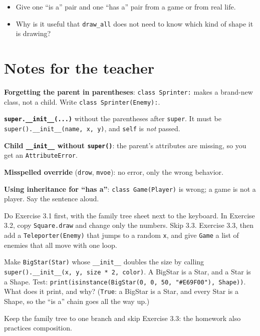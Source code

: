 \begin{reflection}
\begin{itemize}[itemsep=1pt]
  \item Give one \enquote{is a} pair and one \enquote{has a} pair from a game or from real life.
  \item Why is it useful that \texttt{draw\_all} does not need to know which kind of shape it is drawing?
\end{itemize}
\end{reflection}

\section{Notes for the teacher}
\begin{commonmistakes}
  \item \textbf{Forgetting the parent in parentheses}: \texttt{class Sprinter:} makes a brand-new class, not a child. Write \texttt{class Sprinter(Enemy):}.
  \item \textbf{\texttt{super.\_\_init\_\_(...)}} without the parentheses after \texttt{super}. It must be \texttt{super().\_\_init\_\_(name, x, y)}, and \texttt{self} is \emph{not} passed.
  \item \textbf{Child \texttt{\_\_init\_\_} without \texttt{super()}}: the parent's attributes are missing, so you get an \texttt{AttributeError}.
  \item \textbf{Misspelled override} (\texttt{drow}, \texttt{mvoe}): no error, only the wrong behavior.
  \item \textbf{Using inheritance for \enquote{has a}}: \texttt{class Game(Player)} is wrong; a game is not a player. Say the sentence aloud.
\end{commonmistakes}

\begin{differentiation}
\supportpath Do Exercise 3.1 first, with the family tree sheet next to the keyboard. In Exercise 3.2, copy \texttt{Square.draw} and change only the numbers. Skip 3.3.
\extensionpath Exercise 3.3, then add a \texttt{Teleporter(Enemy)} that jumps to a random \texttt{x}, and give \texttt{Game} a list of enemies that all move with one loop.
\end{differentiation}

\begin{stretchchallenge}[Grandchildren]
Make \texttt{BigStar(Star)} whose \texttt{\_\_init\_\_} doubles the size by calling \texttt{super().\_\_init\_\_(x, y, size * 2, color)}. A BigStar is a Star, and a Star is a Shape. Test: \texttt{print(isinstance(BigStar(0, 0, 50, "\#E69F00"), Shape))}. What does it print, and why? (\texttt{True}: a BigStar is a Star, and every Star is a Shape, so the \enquote{is a} chain goes all the way up.)
\end{stretchchallenge}

\begin{teachernote}
Keep the family tree to one branch and skip Exercise 3.3: the homework also practices composition.
\end{teachernote}
